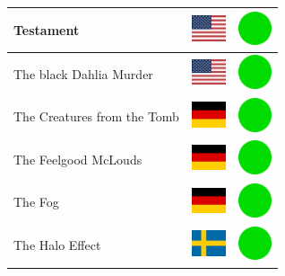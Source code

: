 \documentclass[12pt, a4paper, twoside]{report}
\begin{document}
\begin{center}
\begin{longtable}{|p{5cm}|p{2cm}|p{2cm}|}
Testament & \includegraphics[width=1cm]{4x3/us} & \includegraphics[width=1cm]{likes/y} \\ \hline
The black Dahlia Murder & \includegraphics[width=1cm]{4x3/us} & \includegraphics[width=1cm]{likes/y} \\ \hline
The Creatures from the Tomb & \includegraphics[width=1cm]{4x3/de} & \includegraphics[width=1cm]{likes/y} \\ \hline
The Feelgood McLouds & \includegraphics[width=1cm]{4x3/de} & \includegraphics[width=1cm]{likes/y} \\ \hline
The Fog & \includegraphics[width=1cm]{4x3/de} & \includegraphics[width=1cm]{likes/y} \\ \hline
The Halo Effect & \includegraphics[width=1cm]{4x3/se} & \includegraphics[width=1cm]{likes/y} \\ \hline

\end{longtable}
\end{center}
\end{document}
